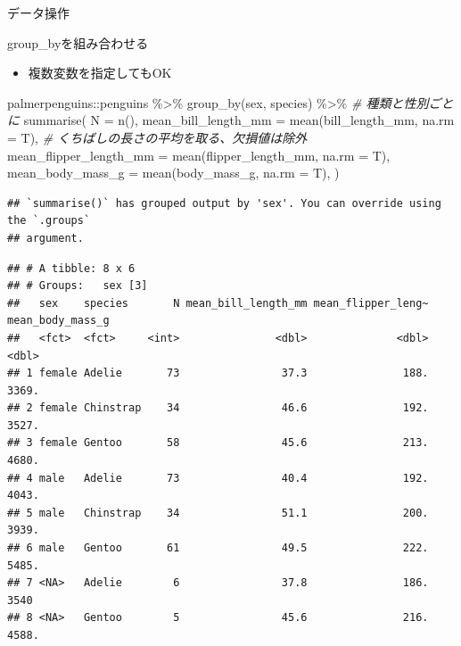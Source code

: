 \documentclass[
  ignorenonframetext,
]{beamer}
\newenvironment{Shaded}{\begin{snugshade}}{\end{snugshade}}
\newcommand{\AttributeTok}[1]{\textcolor[rgb]{0.77,0.63,0.00}{#1}}
\newcommand{\CommentTok}[1]{\textcolor[rgb]{0.56,0.35,0.01}{\textit{#1}}}
\newcommand{\FunctionTok}[1]{\textcolor[rgb]{0.00,0.00,0.00}{#1}}
\newcommand{\NormalTok}[1]{#1}
\newcommand{\SpecialCharTok}[1]{\textcolor[rgb]{0.00,0.00,0.00}{#1}}
\providecommand{\tightlist}{%
  \setlength{\itemsep}{0pt}\setlength{\parskip}{0pt}}
\begin{document}
\begin{frame}[fragile]{データ操作}
\begin{block}{group\_byを組み合わせる}
\protect\hypertarget{group_byux3092ux7d44ux307fux5408ux308fux305bux308b-1}{}
\begin{itemize}
\tightlist
\item
  複数変数を指定してもOK
\end{itemize}

\begin{Shaded}
\begin{Highlighting}[]
\NormalTok{palmerpenguins}\SpecialCharTok{::}\NormalTok{penguins }\SpecialCharTok{\%\textgreater{}\%}
  \FunctionTok{group\_by}\NormalTok{(sex, species) }\SpecialCharTok{\%\textgreater{}\%} \CommentTok{\# 種類と性別ごとに}
  \FunctionTok{summarise}\NormalTok{(}
    \AttributeTok{N =} \FunctionTok{n}\NormalTok{(),}
    \AttributeTok{mean\_bill\_length\_mm =} \FunctionTok{mean}\NormalTok{(bill\_length\_mm, }\AttributeTok{na.rm =}\NormalTok{ T), }\CommentTok{\# くちばしの長さの平均を取る、欠損値は除外}
    \AttributeTok{mean\_flipper\_length\_mm =} \FunctionTok{mean}\NormalTok{(flipper\_length\_mm, }\AttributeTok{na.rm =}\NormalTok{ T),}
    \AttributeTok{mean\_body\_mass\_g =} \FunctionTok{mean}\NormalTok{(body\_mass\_g, }\AttributeTok{na.rm =}\NormalTok{ T),}
\NormalTok{  )}
\end{Highlighting}
\end{Shaded}

\begin{verbatim}
## `summarise()` has grouped output by 'sex'. You can override using the `.groups`
## argument.
\end{verbatim}

\begin{verbatim}
## # A tibble: 8 x 6
## # Groups:   sex [3]
##   sex    species       N mean_bill_length_mm mean_flipper_leng~ mean_body_mass_g
##   <fct>  <fct>     <int>               <dbl>              <dbl>            <dbl>
## 1 female Adelie       73                37.3               188.            3369.
## 2 female Chinstrap    34                46.6               192.            3527.
## 3 female Gentoo       58                45.6               213.            4680.
## 4 male   Adelie       73                40.4               192.            4043.
## 5 male   Chinstrap    34                51.1               200.            3939.
## 6 male   Gentoo       61                49.5               222.            5485.
## 7 <NA>   Adelie        6                37.8               186.            3540 
## 8 <NA>   Gentoo        5                45.6               216.            4588.
\end{verbatim}


\end{block}
\end{frame}
\end{document}
